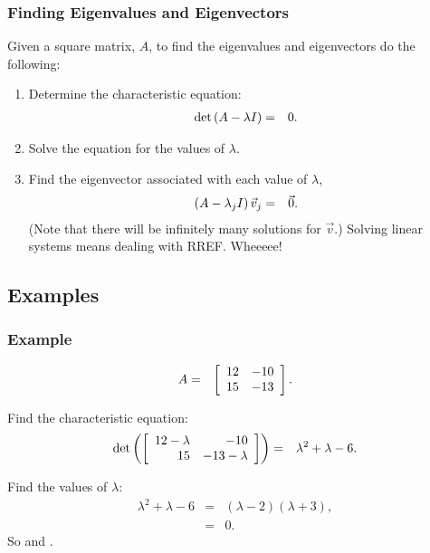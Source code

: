 \begin{frame}
  \frametitle{Finding Eigenvalues and Eigenvectors}

  Given a square matrix, $A$, to find the eigenvalues and eigenvectors do the following:
  \begin{enumerate}
  \item Determine the characteristic equation:
    \begin{eqnarray*}
      \det\left( A - \lambda I \right) & = & 0.
    \end{eqnarray*}
  \item Solve the equation for the values of $\lambda$.
  \item Find the eigenvector associated with each value of $\lambda$,
    \begin{eqnarray*}
      \left( A - \lambda_j I \right) \vec{v}_j & = & \vec{0}.
    \end{eqnarray*}
    (Note that there will be infinitely many solutions for $\vec{v}$.) Solving linear systems means dealing with RREF. Wheeeee!
  \end{enumerate}

\end{frame}

\subsection{Examples}

\begin{frame}
  \frametitle{Example}

  \begin{eqnarray*}
    A & = & \left[ \begin{array}{rr} 12 & -10 \\ 15 & -13 \end{array} \right].
  \end{eqnarray*}

  Find the characteristic equation:
  \begin{eqnarray*}
    \det\left(\left[ \begin{array}{rr} 12-\lambda & -10 \\ 15 & -13-\lambda \end{array} \right]\right) & = & \lambda^2+\lambda-6.
  \end{eqnarray*}

  Find the values of $\lambda$:
  \begin{eqnarray*}
    \lambda^2+\lambda-6 & = & (\lambda-2)(\lambda+3), \\
    & = & 0.
  \end{eqnarray*}
  So  and .

\end{frame}


